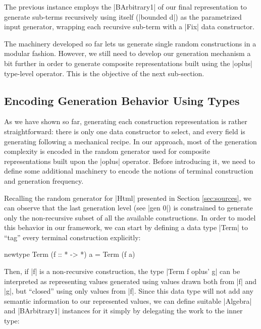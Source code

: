 The previous instance employs the |BArbitrary1| of our final representation to
generate sub-terms recursively using itself (|bounded d|) as the parametrized
input generator, wrapping each recursive sub-term with a |Fix| data constructor.

%
%
The machinery developed so far lets us generate single random constructions in a
modular fashion.
%
However, we still need to develop our generation mechanism a bit further in
order to generate composite representations built using the |oplus| type-level
operator.
%
This is the objective of the next sub-section.

%
\subsection{Encoding Generation Behavior Using Types}

As we have shown so far, generating each construction representation is rather
straightforward: there is only one data constructor to select, and every field
is generating following a mechanical recipe.
%
In our approach, most of the generation complexity is encoded in the random
generator used for composite representations built upon the |oplus| operator.
%
Before introducing it, we need to define some additional machinery to encode the
notions of terminal construction and generation frequency.


Recalling the random generator for |Html| presented in Section
\ref{sec:sources}, we can observe that the last generation level (see |gen 0|)
is constrained to generate only the non-recursive subset of all the available
constructions.
%
In order to model this behavior in our framework, we can start by defining a
data type |Term| to ``tag'' every terminal construction explicitly:

\begin{code}
newtype Term (f :: * -> *) a = Term (f a)
\end{code}

Then, if |f| is a non-recursive construction, the type |Term f oplus' g| can be
interpreted as representing values generated using values drawn both from |f|
and |g|, but ``closed'' using only values from |f|.
%
Since this data type will not add any semantic information to our represented
values, we can define suitable |Algebra| and |BArbitrary1| instances for it
simply by delegating the work to the inner type:

